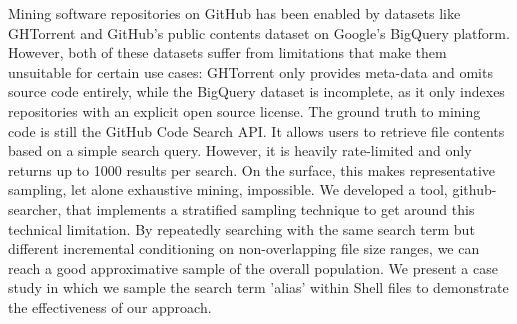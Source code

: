 Mining software repositories on GitHub has been enabled by datasets like GHTorrent and GitHub's public contents dataset on Google's BigQuery platform.
However, both of these datasets suffer from limitations that make them unsuitable for certain use cases: 
GHTorrent only provides meta-data and omits source code entirely, 
while the BigQuery dataset is incomplete, as it only indexes repositories with an explicit open source license.
The ground truth to mining code is still the GitHub Code Search API.
It allows users to retrieve file contents based on a simple search query.
However, it is heavily rate-limited and only returns up to 1000 results per search.
On the surface, this makes representative sampling, let alone exhaustive mining, impossible.
We developed a tool, github-searcher, that implements a stratified sampling technique to get around this technical limitation.
By repeatedly searching with the same search term but different incremental conditioning on non-overlapping file size ranges, we can reach a good approximative sample of the overall population.
We present a case study in which we sample the search term 'alias' within Shell files to demonstrate the effectiveness of our approach.